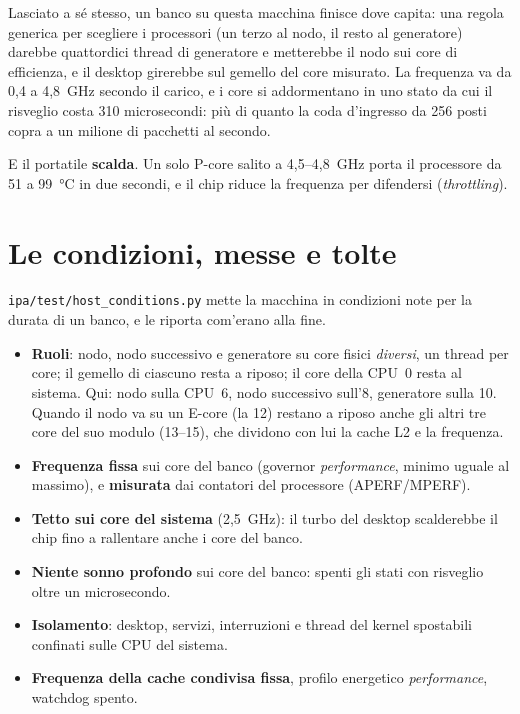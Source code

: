 \documentclass[11pt,a4paper,oneside]{report}
\begin{document}
Lasciato a sé stesso, un banco su questa macchina finisce dove capita: una
regola generica per scegliere i processori (un terzo al nodo, il resto al
generatore) darebbe quattordici thread di generatore e metterebbe il nodo sui
core di efficienza, e il desktop girerebbe sul gemello del core misurato. La
frequenza va da 0,4 a 4,8~GHz secondo il carico, e i core si addormentano in uno
stato da cui il risveglio costa 310 microsecondi: più di quanto la coda
d'ingresso da 256 posti copra a un milione di pacchetti al secondo.

E il portatile \textbf{scalda}. Un solo P-core salito a 4,5--4,8~GHz porta il
processore da 51 a 99~°C in due secondi, e il chip riduce la frequenza per
difendersi (\emph{throttling}).

\section{Le condizioni, messe e tolte}

\texttt{ipa/test/host\_conditions.py} mette la macchina in condizioni note per la
durata di un banco, e le riporta com'erano alla fine.

\begin{itemize}
  \item \textbf{Ruoli}: nodo, nodo successivo e generatore su core fisici
        \emph{diversi}, un thread per core; il gemello di ciascuno resta a riposo;
        il core della CPU~0 resta al sistema. Qui: nodo sulla CPU~6, nodo
        successivo sull'8, generatore sulla 10. Quando il nodo va su un E-core
        (la 12) restano a riposo anche gli altri tre core del suo modulo (13--15),
        che dividono con lui la cache L2 e la frequenza.
  \item \textbf{Frequenza fissa} sui core del banco (governor \emph{performance},
        minimo uguale al massimo), e \textbf{misurata} dai contatori del processore
        (APERF/MPERF).
  \item \textbf{Tetto sui core del sistema} (2,5~GHz): il turbo del desktop
        scalderebbe il chip fino a rallentare anche i core del banco.
  \item \textbf{Niente sonno profondo} sui core del banco: spenti gli stati con
        risveglio oltre un microsecondo.
  \item \textbf{Isolamento}: desktop, servizi, interruzioni e thread del kernel
        spostabili confinati sulle CPU del sistema.
  \item \textbf{Frequenza della cache condivisa fissa}, profilo energetico
        \emph{performance}, watchdog spento.
\end{itemize}
\end{document}

